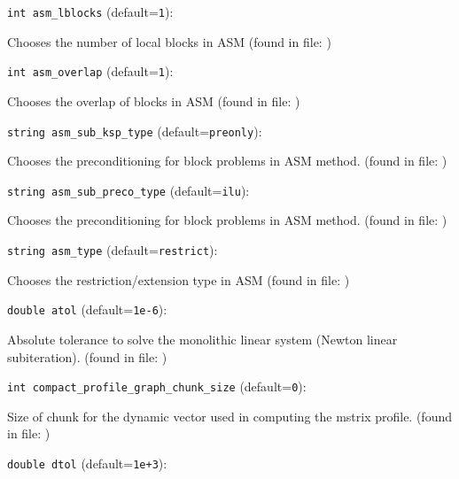 \item\verb+int asm_lblocks+ {\rm(default=\verb|1|)}:

Chooses the number of local blocks in ASM
 (found in file: \verb++)
\item\verb+int asm_overlap+ {\rm(default=\verb|1|)}:

Chooses the overlap of blocks in ASM
 (found in file: \verb++)
\item\verb+string asm_sub_ksp_type+ {\rm(default=\verb|preonly|)}:

Chooses the preconditioning for block problems in ASM method.
 (found in file: \verb++)
\item\verb+string asm_sub_preco_type+ {\rm(default=\verb|ilu|)}:

Chooses the preconditioning for block problems in ASM method.
 (found in file: \verb++)
\item\verb+string asm_type+ {\rm(default=\verb|restrict|)}:

Chooses the restriction/extension type in ASM
 (found in file: \verb++)
\item\verb+double atol+ {\rm(default=\verb|1e-6|)}:

Absolute tolerance to solve the monolithic linear
system (Newton linear subiteration).
 (found in file: \verb++)
\item\verb+int compact_profile_graph_chunk_size+ {\rm(default=\verb|0|)}:

Size of chunk for the dynamic vector used in computing the
mstrix profile. 
 (found in file: \verb++)
\item\verb+double dtol+ {\rm(default=\verb|1e+3|)}:

